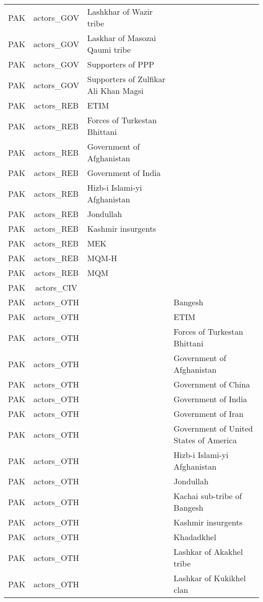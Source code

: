 \documentclass[12pt]{article}
\begin{document}
\begin{center}
\begin{longtable}{|c|c|p{7cm}|p{7cm}|}
  PAK & actors\_GOV & Lashkhar of Wazir tribe &  \\ 
  PAK & actors\_GOV & Laskhar of Masozai Qaumi tribe &  \\ 
  PAK & actors\_GOV & Supporters of PPP &  \\ 
  PAK & actors\_GOV & Supporters of Zulfikar Ali Khan Magsi &  \\ 
  PAK & actors\_REB & ETIM &  \\ 
  PAK & actors\_REB & Forces of Turkestan Bhittani &  \\ 
  PAK & actors\_REB & Government of Afghanistan &  \\ 
  PAK & actors\_REB & Government of India &  \\ 
  PAK & actors\_REB & Hizb-i Islami-yi Afghanistan &  \\ 
  PAK & actors\_REB & Jondullah &  \\ 
  PAK & actors\_REB & Kashmir insurgents &  \\ 
  PAK & actors\_REB & MEK &  \\ 
  PAK & actors\_REB & MQM-H &  \\ 
  PAK & actors\_REB & MQM &  \\ 
  PAK & actors\_CIV &  &  \\ 
  PAK & actors\_OTH &  & Bangesh \\ 
  PAK & actors\_OTH &  & ETIM \\ 
  PAK & actors\_OTH &  & Forces of Turkestan Bhittani \\ 
  PAK & actors\_OTH &  & Government of Afghanistan \\ 
  PAK & actors\_OTH &  & Government of China \\ 
  PAK & actors\_OTH &  & Government of India \\ 
  PAK & actors\_OTH &  & Government of Iran \\ 
  PAK & actors\_OTH &  & Government of United States of America \\ 
  PAK & actors\_OTH &  & Hizb-i Islami-yi Afghanistan \\ 
  PAK & actors\_OTH &  & Jondullah \\ 
  PAK & actors\_OTH &  & Kachai sub-tribe of Bangesh \\ 
  PAK & actors\_OTH &  & Kashmir insurgents \\ 
  PAK & actors\_OTH &  & Khadadkhel \\ 
  PAK & actors\_OTH &  & Lashkar of Akakhel tribe \\ 
  PAK & actors\_OTH &  & Lashkar of Kukikhel clan \\ 

\end{longtable}
\end{center}
\end{document}
